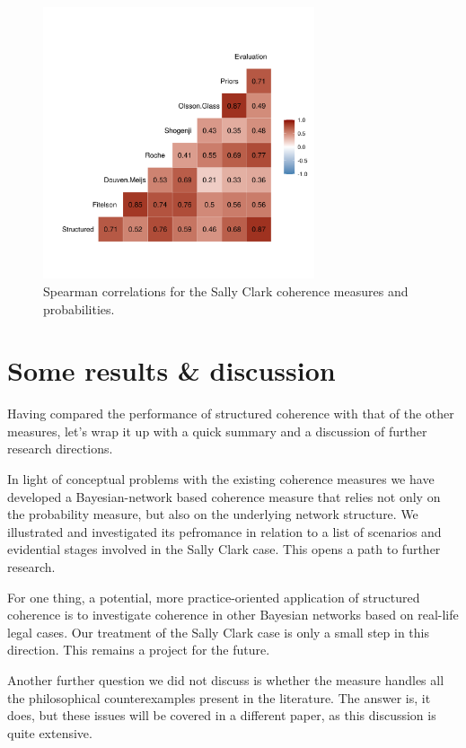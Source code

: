 \documentclass[10pt,]{scrartcl}
\begin{document}
\begin{figure}[H]\centering
    \includegraphics[width = 8cm]{../images/scSpearman.png}
    \caption{Spearman correlations for the Sally Clark coherence measures and probabilities.}
    \label{fig:spearman}
\end{figure}



\section{Some results \& discussion}\label{sec:discussion}




Having compared the performance of structured coherence with that of the other measures, let's wrap it up with a quick summary and a discussion of further research directions. 





In light of conceptual problems with the existing coherence measures we have developed a Bayesian-network based coherence measure that relies not only on the probability measure, but also on the underlying network structure.   We illustrated  and investigated its pefromance in relation to a list of scenarios and evidential stages involved in the Sally Clark case. This opens a path to further research.


For one thing, a potential, more practice-oriented  application of structured coherence is to investigate coherence in other Bayesian networks based on real-life legal cases. Our treatment of the Sally Clark case is only a small step in this direction. This remains a project for the future.


Another further question we did not discuss is whether the measure handles all the philosophical counterexamples present in the literature. The answer is, it does, but these issues will be covered in a different paper, as this discussion is quite extensive. 
\end{document}
